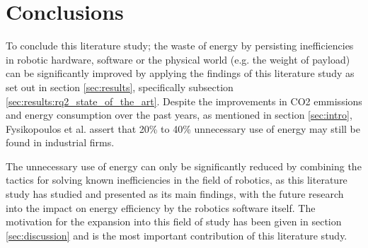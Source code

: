 \section{Conclusions}\label{sec:conclusions}
To conclude this literature study; the waste of energy by persisting inefficiencies in robotic hardware, software or the physical world
(e.g. the weight of payload) can be significantly improved by applying the findings of this literature study as set out in section 
\ref{sec:results}, specifically subsection \ref{sec:results:rq2_state_of_the_art}.
Despite the improvements in CO2 emmissions and energy consumption over the past years, as mentioned in section \ref{sec:intro}, 
Fysikopoulos et al. \cite{fysikopoulos2012automotive_energy_consumption} assert that 20\% to 40\% unnecessary use of energy may 
still be found in industrial firms.

\vspace{5mm}

The unnecessary use of energy can only be significantly reduced by combining the tactics for solving known inefficiencies in the field of robotics,
as this literature study has studied and presented as its main findings, with the future research into the impact on energy efficiency by the
robotics software itself.
The motivation for the expansion into this field of study has been given in section \ref{sec:discussion} and is the most important
contribution of this literature study.